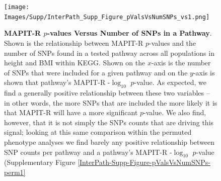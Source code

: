 \documentclass[12pt, a4paper]{article}
\begin{document}
\begin{figure}[htbp]
\centering
\texttt{[image: Images/Supp/InterPath\_Supp\_Figure\_pValsVsNumSNPs\_vs1.png]}
\caption[TBD]{\textbf{MAPIT-R $p$-values Versus Number of SNPs in a Pathway}. \\ Shown is the relationship between MAPIT-R $p$-values and the number of SNPs found in a tested pathway across all populations in height and BMI within KEGG. Shown on the $x$-axis is the number of SNPs that were included for a given pathway and on the $y$-axis is shown that pathway's MAPIT-R -$\log_{10}$ $p$-value. As expected, we find a generally positive relationship between these two variables -- in other words, the more SNPs that are included the more likely it is that MAPIT-R will have a more significant $p$-value. We also find, however, that it is not simply the SNPs counts that are driving this signal; looking at this same comparison within the permuted phenotype analyses we find barely any positive relationship between SNP counts per pathway and a pathway's MAPIT-R -$\log_{10}$ $p$-value (Supplementary Figure \ref{InterPath-Supp-Figure-pValsVsNumSNPs-perm1}}
\label{InterPath-Supp-Figure-pValsVsNumSNPs}
\end{figure}
\clearpage

\end{document}
